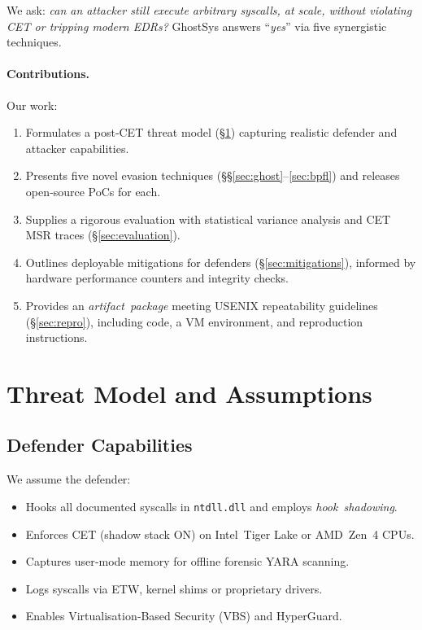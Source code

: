\documentclass[11pt,letterpaper]{article}
\begin{document}
We ask: \emph{can an attacker still execute arbitrary syscalls, at scale, without violating CET or tripping modern EDRs?} GhostSys answers “\emph{yes}” via five synergistic techniques.

\paragraph{Contributions.} Our work:
\begin{enumerate}
  \item Formulates a post‑CET threat model (§\ref{sec:threat}) capturing realistic defender and attacker capabilities.
  \item Presents five novel evasion techniques (§§\ref{sec:ghost}–\ref{sec:bpfl}) and releases open‑source PoCs for each.
  \item Supplies a rigorous evaluation with statistical variance analysis and CET MSR traces (§\ref{sec:evaluation}).
  \item Outlines deployable mitigations for defenders (§\ref{sec:mitigations}), informed by hardware performance counters and integrity checks.
  \item Provides an \emph{artifact package} meeting USENIX repeatability guidelines (§\ref{sec:repro}), including code, a VM environment, and reproduction instructions.
\end{enumerate}

\section{Threat Model and Assumptions}
\label{sec:threat}
\subsection{Defender Capabilities}
We assume the defender:
\begin{itemize}
  \item Hooks all documented syscalls in \texttt{ntdll.dll} and employs \emph{hook shadowing}.
  \item Enforces CET (shadow stack ON) on Intel Tiger Lake or AMD Zen 4 CPUs.
  \item Captures user‑mode memory for offline forensic YARA scanning.
  \item Logs syscalls via ETW, kernel shims or proprietary drivers.
  \item Enables Virtualisation‑Based Security (VBS) and HyperGuard.
\end{itemize}
\end{document}
